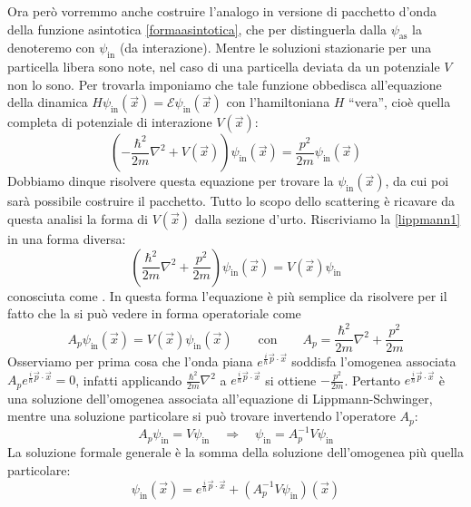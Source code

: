 \documentclass[../../FisicaTeorica.tex]{subfiles}
\begin{document}
Ora per{\`o} vorremmo anche costruire l'analogo in versione di pacchetto
d'onda della funzione asintotica \eqref{formaasintotica}, che per distinguerla dalla $\psi_{\text{as}}$ la denoteremo con $\psi_{\text{in}}$ (da interazione). Mentre le soluzioni
stazionarie per una particella libera sono note, nel caso di una particella
deviata da un potenziale $V$ non lo sono. Per trovarla imponiamo che tale
funzione obbedisca all'equazione della dinamica $H \psi_{\text{in}} (\vec{x})
= \mathcal{E} \psi_{\text{in}} (\vec{x})$ con l'hamiltoniana $H$ ``vera'',
cio{\`e} quella completa di potenziale di interazione $V (\vec{x})$:
\begin{equation}
  \label{lippmann1} \left( - \frac{\hbar^2}{2 m} \nabla^2 + V (\vec{x})
  \right) \psi_{\text{in}} (\vec{x}) = \frac{p^2}{2 m} \psi_{\text{in}}
  (\vec{x})
\end{equation}
Dobbiamo dinque risolvere questa equazione per trovare la $\psi_{\text{in}}
(\vec{x})$, da cui poi sar{\`a} possibile costruire il pacchetto. Tutto lo
scopo dello scattering {\`e} ricavare da questa analisi la forma di $V
(\vec{x})$ dalla sezione d'urto. Riscriviamo la {\eqref{lippmann1}} in una
forma diversa:
\begin{equation}
  \label{lippmann2} \left( \frac{\hbar^2}{2 m} \nabla^2 + \frac{p^2}{2 m}
  \right) \psi_{\text{in}} (\vec{x}) = V (\vec{x}) \psi_{\text{in}}
\end{equation}
conosciuta come {}. In questa forma
l'equazione {\`e} pi{\`u} semplice da risolvere per il fatto che la si pu{\`o}
vedere in forma operatoriale come
\[ A_p \psi_{\text{in}} (\vec{x}) = V (\vec{x}) \psi_{\text{in}} (\vec{x})
   \qquad \text{con} \qquad A_p = \frac{\hbar^2}{2 m} \nabla^2 + \frac{p^2}{2
   m} \]
Osserviamo per prima cosa che l'onda piana $e^{\frac{i}{\hbar}  \vec{p} \cdot
\vec{x}}$ soddisfa l'omogenea associata $A_p e^{\frac{i}{\hbar}  \vec{p} \cdot
\vec{x}} = 0$, infatti applicando $\frac{\hbar^2}{2 m} \nabla^2$ a
$e^{\frac{i}{\hbar}  \vec{p} \cdot \vec{x}}$ si ottiene $- \frac{p^2}{2 m}$.
Pertanto $e^{\frac{i}{\hbar}  \vec{p} \cdot \vec{x}}$ {\`e} una soluzione
dell'omogenea associata all'equazione di Lippmann-Schwinger, mentre una
soluzione particolare si pu{\`o} trovare invertendo l'operatore $A_p$:
\[ A_p \psi_{\text{in}} = V \psi_{\text{in}}  \quad \Longrightarrow \quad
   \psi_{\text{in}} = A_p^{- 1} V \psi_{\text{in}} \]
La soluzione formale generale {\`e} la somma della soluzione dell'omogenea
pi{\`u} quella particolare:
\begin{equation}
\label{soluzionegenerale}
\psi_{\text{in}} (\vec{x}) = e^{\frac{i}{\hbar}  \vec{p} \cdot \vec{x}} +
   (A_p^{- 1} V \psi_{\text{in}}) (\vec{x})
\end{equation}
\end{document}
